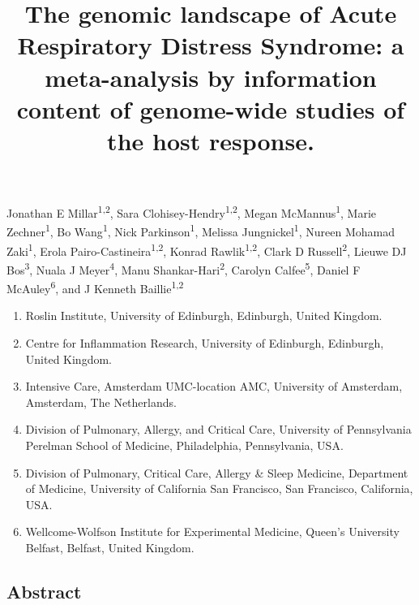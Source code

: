 \documentclass[
  11,
  a4paper,
]{article}
\title{The genomic landscape of Acute Respiratory Distress Syndrome: a
meta-analysis by information content of genome-wide studies of the host
response.}
\author{}
\date{}
\providecommand{\tightlist}{%
  \setlength{\itemsep}{0pt}\setlength{\parskip}{0pt}}\usepackage{longtable,booktabs,array}
\begin{document}
\maketitle
\ifdefined\Shaded\renewenvironment{Shaded}{\begin{tcolorbox}[boxrule=0pt, borderline west={3pt}{0pt}{shadecolor}, interior hidden, enhanced, sharp corners, frame hidden, breakable]}{\end{tcolorbox}}\fi

Jonathan E Millar\textsuperscript{1,2}, Sara
Clohisey-Hendry\textsuperscript{1,2}, Megan McMannus\textsuperscript{1},
Marie Zechner\textsuperscript{1}, Bo Wang\textsuperscript{1}, Nick
Parkinson\textsuperscript{1}, Melissa Jungnickel\textsuperscript{1},
Nureen Mohamad Zaki\textsuperscript{1}, Erola
Pairo-Castineira\textsuperscript{1,2}, Konrad
Rawlik\textsuperscript{1,2}, Clark D Russell\textsuperscript{2}, Lieuwe
DJ Bos\textsuperscript{3}, Nuala J Meyer\textsuperscript{4}, Manu
Shankar-Hari\textsuperscript{2}, Carolyn Calfee\textsuperscript{5},
Daniel F McAuley\textsuperscript{6}, and J Kenneth
Baillie\textsuperscript{1,2}

\begin{enumerate}
\def\labelenumi{\arabic{enumi}.}
\tightlist
\item
  Roslin Institute, University of Edinburgh, Edinburgh, United Kingdom.
\item
  Centre for Inflammation Research, University of Edinburgh, Edinburgh,
  United Kingdom.
\item
  Intensive Care, Amsterdam UMC-location AMC, University of Amsterdam,
  Amsterdam, The Netherlands.
\item
  Division of Pulmonary, Allergy, and Critical Care, University of
  Pennsylvania Perelman School of Medicine, Philadelphia, Pennsylvania,
  USA.
\item
  Division of Pulmonary, Critical Care, Allergy \& Sleep Medicine,
  Department of Medicine, University of California San Francisco, San
  Francisco, California, USA.
\item
  Wellcome-Wolfson Institute for Experimental Medicine, Queen's
  University Belfast, Belfast, United Kingdom.
\end{enumerate}

\newpage

\hypertarget{abstract}{%
\subsection{Abstract}\label{abstract}}
\end{document}
